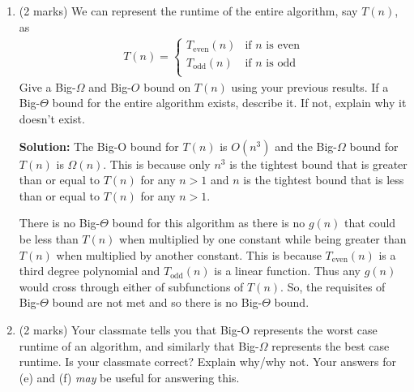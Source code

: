 \documentclass[a4,13pt]{extarticle}
\newenvironment{Solution}{\color{blue}\textbf{Solution:}}{}
\begin{document}
\begin{enumerate}
\begin{enumerate}
\begin{Solution}
				Conversely, the worst case must be for the even case or when the running time is $2n^3$. The Big-$\Omega$ for this case is $O(n^3)$.

				Both of these bounds have been proven in previous sections.
			\end{Solution}
			  
			\medskip     	      	      	      
	      	      	      	                  
	      	\item (2 marks) We can represent the runtime of the entire algorithm, say $T(n)$, as
	      	      \begin{align*}
	      	      	T(n)=\begin{cases}
	      	      	T_{\text{even}}(n) & \text{if $n$ is even} \\
	      	      	T_{\text{odd}}(n)  & \text{if $n$ is odd}  \\
	      	      	\end{cases}
	      	      \end{align*}
	      	      Give a Big-$\Omega$ and Big-$O$ bound on $T(n)$ using your previous results. If a Big-$\Theta$ bound for the entire algorithm exists, describe it. If not, explain why it doesn’t exist.
	      	      
			\begin{Solution}
				The Big-O bound for $T(n)$ is $O(n^3)$ and the Big-$\Omega$ bound for $T(n)$ is $\Omega(n)$. This is because only $n^3$ is the tightest bound that is greater than or equal to $T(n)$ for any $n > 1$ and $n$ is the tightest bound that is less than or equal to $T(n)$ for any $n > 1$.

				\medskip

				There is no Big-$\Theta$ bound for this algorithm as there is no $g(n)$ that could be less than $T(n)$ when multiplied by one constant while being greater than $T(n)$ when multiplied by another constant. This is because $T_{\text{even}}(n)$ is a third degree polynomial and $T_{\text{odd}}(n)$ is a linear function. Thus any $g(n)$ would cross through either of subfunctions of $T(n)$. So, the requisites of Big-$\Theta$ bound are not met and so there is no Big-$\Theta$ bound.
	      	\end{Solution}
						   
			\medskip

	      	\item (2 marks) Your classmate tells you that Big-O represents the worst case runtime of an algorithm, and similarly that Big-$\Omega$ represents the best case runtime. Is your classmate correct? Explain why/why not. Your answers for (e) and (f) \textit{may} be useful for answering this.
	      	      

\end{enumerate}
\end{enumerate}
\end{document}
